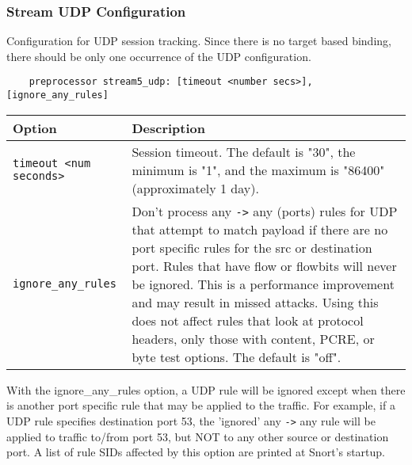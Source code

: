 \documentclass[english]{report}
\newenvironment{note}{
\samepage
    \vspace{10pt}{\textsf{
        {\hspace{7pt}\Huge{$\triangle$\hspace{-12.5pt}{\Large{$^!$}}}}\hspace{5pt}
        {\Large{NOTE}}
    }
    }
   \begin{center}
    \par\vspace{-17pt}

    \begin{lrbox}{\savepar}
    \begin{minipage}[r]{6in}
}
{
    \end{minipage}
    \end{lrbox}
    \fbox{
        \usebox{
            \savepar
	}
    }
    \par\vskip10pt
    \end{center}
}
\newenvironment{note}{
        \begin{rawhtml}
        <p><table border="1"><tr><td><b>
        Note:&nbsp;&nbsp;</b>
        \end{rawhtml}
}{
        \begin{rawhtml}
        </b></td></tr></table></p>
        \end{rawhtml}
}
\begin{document}
\subsubsection{Stream UDP Configuration}

Configuration for UDP session tracking.  Since there is no target based
binding, there should be only one occurrence of the UDP configuration.

\begin{verbatim}
    preprocessor stream5_udp: [timeout <number secs>], [ignore_any_rules]
\end{verbatim}

\begin{center}
\begin{tabular}{| l | p{4.5in} |}

\hline
\textbf{Option} & \textbf{Description}\\
\hline 

\hline 
\texttt{timeout <num seconds>} &

Session timeout.  The default is "30", the minimum is "1", and the maximum is
"86400" (approximately 1 day).\\

\hline
\texttt{ignore\_any\_rules} &

Don't process any \texttt{->} any (ports) rules for UDP that attempt to match
payload if there are no port specific rules for the src or destination port.
Rules that have flow or flowbits will never be ignored.  This is a performance
improvement and may result in missed attacks.  Using this does not affect rules
that look at protocol headers, only those with content, PCRE, or byte test
options.  The default is "off".\\

\hline
\end{tabular}
\end{center}

\begin{note}

With the ignore\_any\_rules option, a UDP rule will be ignored except when
there is another port specific rule that may be applied to the traffic.  For
example, if a UDP rule specifies destination port 53, the 'ignored' any
\texttt{->} any rule will be applied to traffic to/from port 53, but NOT to any
other source or destination port.  A list of rule SIDs affected by this option
are printed at Snort's startup.

\end{note}
\end{document}
